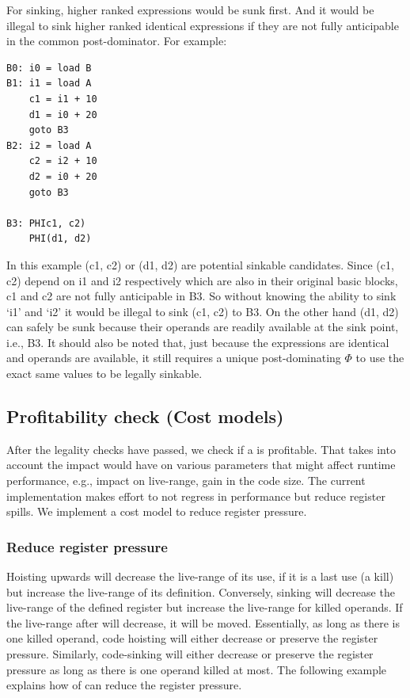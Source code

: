 \documentclass[sigplan,10pt,review,anonymous]{acmart}\settopmatter{printfolios=true,printccs=false,printacmref=false}
\begin{document}
For sinking, higher ranked expressions would be sunk first. And it would
be illegal to sink higher ranked identical expressions if they are not fully
anticipable in the common post-dominator. For example:

\begin{lstlisting}
B0: i0 = load B
B1: i1 = load A
    c1 = i1 + 10
    d1 = i0 + 20
    goto B3
B2: i2 = load A
    c2 = i2 + 10
    d2 = i0 + 20
    goto B3

B3: PHIc1, c2)
    PHI(d1, d2)
\end{lstlisting}

In this example (c1, c2) or (d1, d2) are potential sinkable candidates. Since
(c1, c2) depend on i1 and i2 respectively which are also in their original basic
blocks, c1 and c2 are not fully anticipable in B3. So without knowing the
ability to sink `i1' and `i2' it would be illegal to sink (c1, c2) to B3. On the
other hand (d1, d2) can safely be sunk because their operands are readily
available at the sink point, i.e., B3. It should also be noted that, just
because the expressions are identical and operands are available, it still
requires a unique post-dominating $\Phi$ to use the exact same values to be
legally sinkable.

\subsection{Profitability check (Cost models)}
\label{subsec:cost-models}
After the legality checks have passed, we check if a \GCM{} is profitable.  That
takes into account the impact \GCM{} would have on various parameters that might
affect runtime performance, e.g., impact on live-range, gain in the code
size. The current implementation makes effort to not regress in performance but
reduce register spills. We implement a cost model to reduce register pressure.

\subsubsection{Reduce register pressure}
\label{hoist:reg-pressure}
Hoisting upwards will decrease the live-range of its use, if it is a last use (a
kill) but increase the live-range of its definition. Conversely, sinking will
decrease the live-range of the defined register but increase the live-range for
killed operands. If the live-range after \GCM{} will decrease, it will be
moved. Essentially, as long as there is one killed operand, code hoisting will
either decrease or preserve the register pressure.  Similarly, code-sinking will
either decrease or preserve the register pressure as long as there is one
operand killed at most.  The following example explains how \GCM{} of can reduce
the register pressure.
\end{document}
